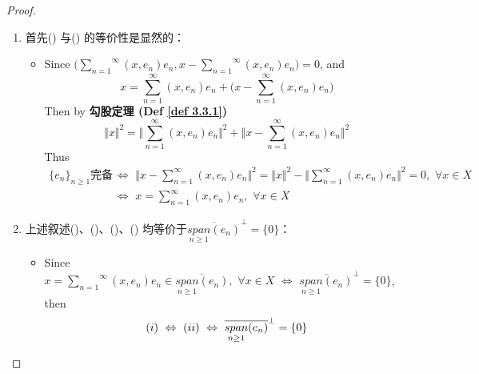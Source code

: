 \begin{thm}
		\begin{proof}
			\begin{enumerate}
				\item 首先() 与() 的等价性是显然的：
				\begin{itemize}
					\item Since $\Big( \overset{\infty}{\underset{n = 1}{\sum}} (x , e_n) e_n , x - \overset{\infty}{\underset{n = 1}{\sum}} (x , e_n) e_n \Big) = 0$, and
					\[
					x = \sum_{n = 1}^{\infty} (x  ,e_n) e_n + \Big( x - \sum_{n = 1}^{\infty} (x , e_n) e_n \Big)
					\]
					Then by \textbf{勾股定理 (Def \ref{def 3.3.1})}
					\[ \Vert x \Vert^2 = \Big\Vert \sum_{n = 1}^{\infty} (x , e_n) e_n \Big\Vert^2 + \Big\Vert x - \sum_{n = 1}^{\infty} (x , e_n) e_n \Big\Vert^2 \]
					Thus 
					\begin{align}
						\{ e_n \}_{n \geq 1} \text{完备} 
						\,\, &\Leftrightarrow \,\, 
						\Big\Vert x - \sum_{n = 1}^{\infty} (x , e_n) e_n \Big\Vert^2 
						= \Vert x \Vert^2 - \Big\Vert \sum_{n = 1}^{\infty} (x , e_n) e_n \Big\Vert^2 = 0 , \,\, \forall x \in X \\
						&\Leftrightarrow \,\, x = \sum_{n = 1}^{\infty} (x , e_n) e_n , \,\, \forall x \in X
					\end{align} 
				\end{itemize}
				
				\vspace{4em}
				
				\item 上述叙述()、()、()、() 均等价于$\overline{\underset{n \geq 1}{span}(e_n)}^{\perp} = \{ 0 \}$：
				\begin{itemize}
					\item Since $x = \overset{\infty}{\underset{n = 1}{\sum}} (x , e_n) e_n \in \overline{\underset{n \geq 1}{span} (e_n)} , \,\, \forall x \in X \,\, \Leftrightarrow \,\, \overline{\underset{n \geq 1}{span} (e_n)}^{\perp} = \{ 0 \}$, then
					\[ (\rmnum{1}) \,\, \Leftrightarrow \,\, (\rmnum{2}) \,\, \Leftrightarrow \,\, \overline{\underset{n \geq 1}{span} (e_n)}^{\perp} = \{ 0 \} \]
					
					\vspace{2em}
					

\end{itemize}
\end{enumerate}
\end{proof}
\end{thm}
